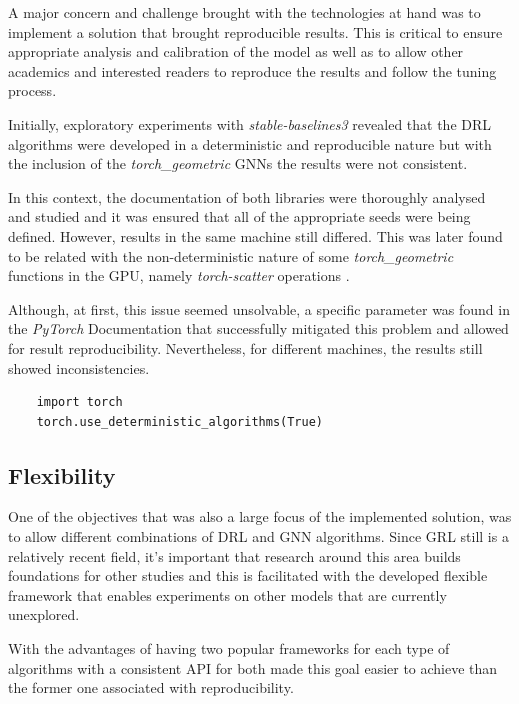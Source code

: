 A major concern and challenge brought with the technologies at hand was to implement a solution that brought reproducible results. This is critical to ensure appropriate analysis and calibration of the model as well as to allow other academics and interested readers to reproduce the results and follow the tuning process. \par

Initially, exploratory experiments with \textit{stable-baselines3} revealed that the \ac{DRL} algorithms were developed in a deterministic and reproducible nature but with the inclusion of the \textit{torch\_geometric}  \acp{GNN} the results were not consistent. \par

In this context, the documentation of both libraries were thoroughly analysed and studied and it was ensured that all of the appropriate seeds were being defined. However, results in the same machine still differed. This was later found to be related with the non-deterministic nature of some \textit{torch\_geometric} functions in the GPU, namely \textit{torch-scatter} operations \cite{NotReproducibleSetting} \cite{ReproducibilityPyTorchDocumentation}. \par

Although, at first, this issue seemed unsolvable, a specific parameter was found in the \textit{PyTorch} Documentation \cite{ReproducibilityPyTorchDocumentation} that successfully mitigated this problem and allowed for result reproducibility. Nevertheless, for different machines, the results still showed inconsistencies. \par

\begin{lstlisting}
	import torch
	torch.use_deterministic_algorithms(True)
\end{lstlisting}

\subsection{Flexibility}

One of the objectives that was also a large focus of the implemented solution, was to allow different combinations of \ac{DRL} and \ac{GNN} algorithms. Since \ac{GRL} still is a relatively recent field, it's important that research around this area builds foundations for other studies and this is facilitated with the developed flexible framework that enables experiments on other models that are currently unexplored. \par
With the advantages of having two popular frameworks for each type of algorithms with a consistent API for both made this goal easier to achieve than the former one associated with reproducibility. \par


